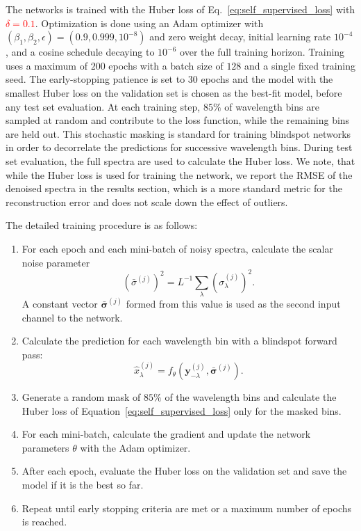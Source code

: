 \documentclass[twocolumn]{aastex7}
\newcommand{\ld}[1]{\textcolor{red}{\textbf{#1}}}
\newcommand{\m}[1]{\boldsymbol{#1}}
\begin{document}
The networks is trained with the Huber loss of Eq.~\ref{eq:self_supervised_loss} with \ld{$\delta=0.1$}. Optimization is done using an Adam optimizer with $(\beta_1,\beta_2,\epsilon)=(0.9,0.999,10^{-8})$ and zero weight decay, initial learning rate $10^{-4}$, and a cosine schedule decaying to $10^{-6}$ over the full training horizon. Training uses a maximum of $200$ epochs with a batch size of $128$ and a single fixed training seed. The early-stopping patience is set to $30$ epochs and the model with the smallest Huber loss on the validation set is chosen as the best-fit model, before any test set evaluation. At each training step, $85\%$ of wavelength bins are sampled at random and contribute to the loss function, while the remaining bins are held out. This stochastic masking is standard for training blindspot networks in order to decorrelate the predictions for successive wavelength bins. During test set evaluation, the full spectra are used to calculate the Huber loss. We note, that while the Huber loss is used for training the network, we report the RMSE of the denoised spectra in the results section, which is a more standard metric for the reconstruction error and does not scale down the effect of outliers.

The detailed training procedure is as follows:
\begin{enumerate}
    \item For each epoch and each mini-batch of noisy spectra, calculate the scalar noise parameter
        \begin{equation*}
            \left( \bar{\sigma}^{(j)} \right)^2 = L^{-1}\sum_{\lambda} \left( \sigma_{\lambda}^{(j)} \right)^{2}.
        \end{equation*}
        A constant vector $\bar{\m{\sigma}}^{(j)}$ formed from this value is used as the second input channel to the network.
    \item Calculate the prediction for each wavelength bin with a blindspot forward pass:
        \begin{equation*}
            \hat{x}_{\lambda}^{(j)} = f_{\theta}(\m{y}_{-\lambda}^{(j)},\bar{\m{\sigma}}^{(j)}).
        \end{equation*}
    \item Generate a random mask of $85\%$ of the wavelength bins and calculate the Huber loss of Equation~\ref{eq:self_supervised_loss} only for the masked bins.
    \item For each mini-batch, calculate the gradient and update the network parameters $\theta$ with the Adam optimizer.
    \item After each epoch, evaluate the Huber loss on the validation set and save the model if it is the best so far.
    \item Repeat until early stopping criteria are met or a maximum number of epochs is reached.
\end{enumerate}
\end{document}
